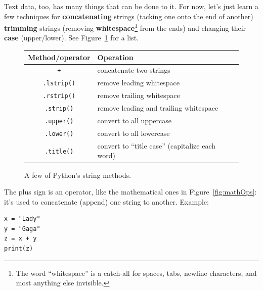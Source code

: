 \label{concatenatingStrings}
Text data, too, has many things that can be done to it. For now, let's just
learn a few techniques for \textbf{concatenating} strings (tacking one onto the
end of another) \textbf{trimming} strings (removing
\textbf{whitespace}\footnote{The word ``whitespace'' is a catch-all for spaces,
tabs, newline characters, and most anything else invisible.} from the ends) and
changing their \textbf{case} (upper/lower). See Figure~\ref{fig:stringOps} for
a list.


\begin{figure}[ht]
\small
\centering
\begingroup
\par\tagpdfparaOff
{}
\begin{tabular}{c | l}
\hline
Method/operator & Operation \\
\hline
\texttt{+} & concatenate two strings \\
\texttt{.lstrip()} & remove leading whitespace \\
\texttt{.rstrip()} & remove trailing whitespace \\
\texttt{.strip()} & remove leading and trailing whitespace \\
\texttt{.upper()} & convert to all uppercase \\
\texttt{.lower()} & convert to all lowercase \\
\texttt{.title()} & convert to ``title case'' (capitalize each word) \\
\hline
\end{tabular}\par
\endgroup
\smallskip
\caption{A few of Python's string methods.}
\label{fig:stringOps}
\end{figure}

The plus sign is an operator, like the mathematical ones in
Figure~\ref{fig:mathOps}: it's used to concatenate (append) one string to
another. Example:

\begin{Verbatim}[fontsize=\small,samepage=true,frame=single,framesep=3mm]
x = "Lady"
y = "Gaga"
z = x + y
print(z)
\end{Verbatim}

